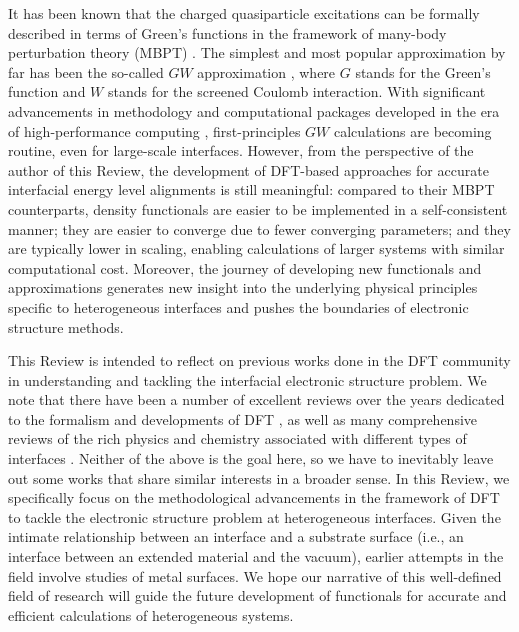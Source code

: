 \documentclass[aip, amsmath, amssymb, reprint, longbibliography]{revtex4-2}
\begin{document}
It has been known that the charged quasiparticle excitations can be formally described in terms of Green's functions in the framework of many-body perturbation theory (MBPT) \cite{ORR02}. The simplest and most popular approximation by far has been the so-called $GW$ approximation \cite{H65}, where $G$ stands for the Green's function and $W$ stands for the screened Coulomb interaction. With significant advancements in methodology and computational packages developed in the era of high-performance computing \cite{yambo,BerkeleyGW,WEST}, first-principles $GW$ calculations are becoming routine, even for large-scale interfaces. However, from the perspective of the author of this Review, the development of DFT-based approaches for accurate interfacial energy level alignments is still meaningful: compared to their MBPT counterparts, density functionals are easier to be implemented in a self-consistent manner; they are easier to converge due to fewer converging parameters; and they are typically lower in scaling, enabling calculations of larger systems with similar computational cost. Moreover, the journey of developing new functionals and approximations generates new insight into the underlying physical principles specific to heterogeneous interfaces and pushes the boundaries of electronic structure methods.

This Review is intended to reflect on previous works done in the DFT community in understanding and tackling the interfacial electronic structure problem. We note that there have been a number of excellent reviews over the years dedicated to the formalism and developments of DFT \cite{CMY12,B12,B14,J15,YLT16,DFTexchange}, as well as many comprehensive reviews of the rich physics and chemistry associated with different types of interfaces \cite{HZS18,XNK20,CZL20,GBN21}. Neither of the above is the goal here, so we have to inevitably leave out some works that share similar interests in a broader sense. In this Review, we specifically focus on the methodological advancements in the framework of DFT to tackle the electronic structure problem at heterogeneous interfaces. Given the intimate relationship between an interface and a substrate surface (i.e., an interface between an extended material and the vacuum), earlier attempts in the field involve studies of metal surfaces. We hope our narrative of this well-defined field of research will guide the future development of functionals for accurate and efficient calculations of heterogeneous systems.
\end{document}
